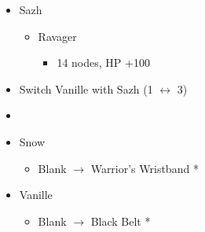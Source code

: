 \begin{multicols}{2}
\begin{menu}
\begin{itemize}
\begin{itemize}
\begin{itemize}
        \end{itemize}
        \item Sazh
        \begin{itemize}
            \item Ravager
            \begin{itemize}
                \item 14 nodes,  HP +100
            \end{itemize}
        \end{itemize}
    \end{itemize}
    \paradigm
    \begin{itemize}
        \item Switch Vanille with Sazh (1 $\leftrightarrow$ 3)
        \item {}%
{\paradigmline{\com}{(\com)}{(\com)}}%
{\paradigmline[2]{\textit{\com}}{\textit{(\com)}}{\textit{(\com)}}}%
{\paradigmline{\syn}{\sen}{(\sab)}}%
{\paradigmline{[\syn]}{\rav}{(\med)}}%
{\paradigmline{\rav}{\rav}{[\med]}}%
{\paradigmline{\rav}{\rav}{[\rav]}}
    \end{itemize}
    \equip
    \begin{itemize}
        \item Snow
        \begin{itemize}
            \item Blank $\rightarrow$ Warrior's Wristband *
        \end{itemize}
        \item Vanille
        \begin{itemize}
            \item Blank $\rightarrow$ Black Belt * 
        \end{itemize}
    \end{itemize}
\end{itemize}
\end{menu}

\renewcommand{\first}{[1] Cerberus (\com/\com/\com)}
\renewcommand{\second}{[2] Cerberus (\com/\com/\com)}
\renewcommand{\third}{[3] Premeditation (\syn/\sen/\sab)}
\renewcommand{\fourth}{[4] Coordination (\syn/\rav/\med)}
\renewcommand{\fifth}{[5] Thaumaturgy (\rav/\rav/\med)}
\renewcommand{\sixth}{[6] Tri-Disaster (\rav/\rav/\rav)}


\end{multicols}
